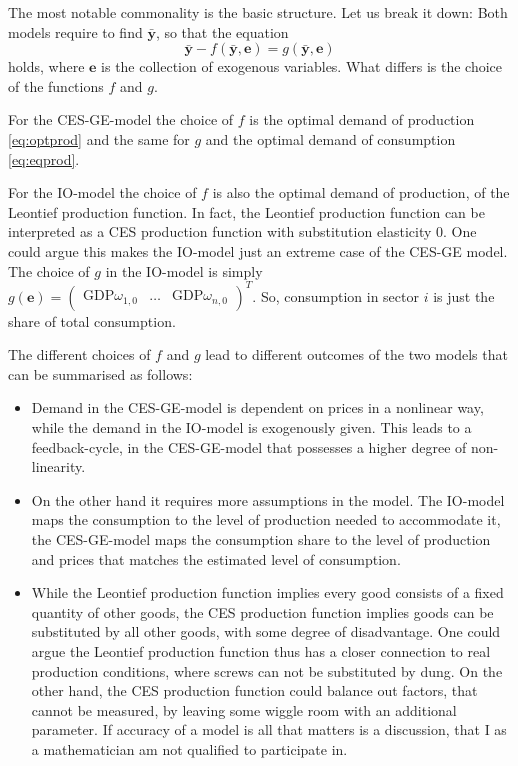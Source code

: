 \documentclass{article}
\begin{document}
The most notable commonality is the basic structure. Let us break it down:
Both models require to find $\bar {\mathbf y}$, so that the equation 
\begin{equation}
  \bar {\mathbf y} - f(\bar {\mathbf y}, \mathbf e) = g(\bar{\mathbf y},\mathbf e)
  \label{eq:models}
\end{equation}
holds, where $\mathbf e$ is the collection of exogenous variables. 
What differs is the choice of the functions $f$ and $g$.

For the CES-GE-model the choice of $f$ is the optimal demand of production \eqref{eq:optprod} and the same for $g$ and the optimal demand of consumption \eqref{eq:eqprod}.

For the IO-model the choice of $f$ is also the optimal demand of production, of the Leontief production function. In fact, the Leontief production function can be interpreted as a CES production function with substitution elasticity $0$. 
One could argue this makes the IO-model just an extreme case of the CES-GE model.
The choice of $g$ in the IO-model is simply $g(\mathbf e) = \begin{pmatrix}
  \text{GDP} \omega_{1,0} & \dots & \text{GDP} \omega_{n,0}
\end{pmatrix}^T.$
So, consumption in sector $i$ is just the share of total consumption. 

The different choices of $f$ and $g$ lead to different outcomes of the two models that can be summarised as follows:

\begin{itemize}
  \item Demand in the CES-GE-model is dependent on prices in a nonlinear way, while the demand in the IO-model is exogenously given. This leads to a feedback-cycle, in the CES-GE-model that possesses a higher degree of non-linearity.
  \item On the other hand it requires more assumptions in the model. The IO-model maps the consumption to the level of production needed to accommodate it, the CES-GE-model maps the consumption share to the level of production and prices 
    that matches the estimated level of consumption.
  \item While the Leontief production function implies every good consists of a fixed quantity of other goods, the CES production function implies goods can be substituted by all other goods, with some degree of disadvantage. 
    One could argue the Leontief production function thus has a closer connection to real production conditions, where screws can not be substituted by dung. On the other hand, the CES production function could balance out factors, that cannot be measured, by leaving some wiggle room with an additional parameter. 
    If accuracy of a model is all that matters is a discussion, that I as a mathematician am not qualified to participate in. 

\end{itemize}
\end{document}
